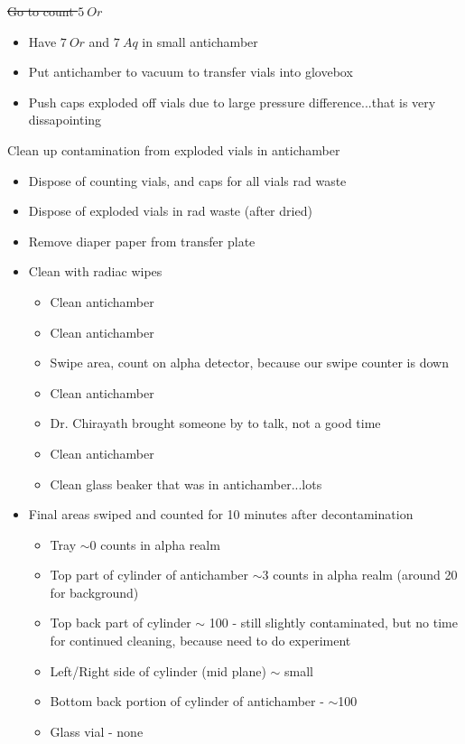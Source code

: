 \documentclass[idxtotoc,hyperref,openany,oneside]{labbook} %
\newcommand{\cmark}{\ding{51}}%
\newcommand{\done}{\rlap{$\square$}{\raisebox{2pt}{\large\hspace{1pt}\cmark}}%
  \hspace{-2.5pt}}
\begin{document}
\begin{todolist}
\item{\st{Go to count $\boxed{5\ Or}$}}
  \begin{itemize}
  \item{Have $\boxed{7\ Or}$ and $\boxed{7\ Aq}$ in small
    antichamber}
  \item{Put antichamber to vacuum to transfer vials into
    glovebox}
  \item{Push caps exploded off vials due to large pressure
    difference...that is very dissapointing}
  \end{itemize}
\item[\done]{Clean up contamination from exploded vials in antichamber}
  \begin{itemize}
  \item{Dispose of counting vials, and caps for all vials rad waste}
  \item{Dispose of exploded vials in rad waste (after dried)}
  \item{Remove diaper paper from transfer plate}
  \item{Clean with radiac wipes}
    \begin{itemize}
    \item{Clean antichamber}
    \item{Clean antichamber}
    \item{Swipe area, count on alpha detector, because
      our swipe counter is down}
    \item{Clean antichamber}
    \item{Dr. Chirayath brought someone by to talk, not a good time}
    \item{Clean antichamber}
    \item{Clean glass beaker that was in antichamber...lots}
    \end{itemize}
  \item{Final areas swiped and counted for 10
    minutes after decontamination}
    \begin{itemize}
    \item{Tray $\sim$0 counts in alpha realm}
    \item{Top part of cylinder of antichamber
      $\sim$3 counts in alpha realm (around 20 for background)}
    \item{Top back part of cylinder $\sim$ 100 - still slightly
      contaminated, but no time for continued cleaning,
      because need to do experiment}
    \item{Left/Right side of cylinder (mid plane) $\sim$ small}
    \item{Bottom back portion of cylinder of antichamber - $\sim$100}
    \item{Glass vial - none}
    \end{itemize}
  \end{itemize}
\end{todolist}
\end{document}
